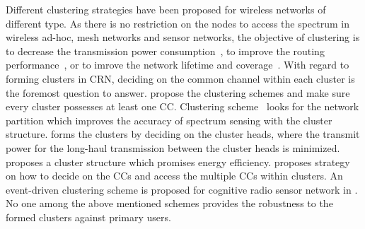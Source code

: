 \documentclass[10pt,journal,compsoc]{IEEEtran}
\theoremstyle{mytheoremstyle}
\theoremstyle{mytheoremstyle}
\theoremstyle{mytheoremstyle}
\begin{document}
Different clustering strategies have been proposed for wireless networks of different type.
As there is no restriction on the nodes to access the spectrum in wireless ad-hoc, mesh networks and sensor networks, the objective of clustering is to decrease the transmission power consumption~\cite{Kawadia03}, to improve the routing performance~\cite{clustering_mesh_globecom2010}, or to imrove the network lifetime and coverage~\cite{Abbasi_survey_07}.
With regard to forming clusters in CRN, deciding on the common channel within each cluster is the foremost question to answer.
\cite{Zhao07, Chen07,Affinity_clustering_09icccn} propose the clustering schemes and make sure every cluster possesses at least one CC.
Clustering scheme~\cite{Consensus_based_clustering12} looks for the network partition which improves the accuracy of spectrum sensing with the cluster structure.
\cite{TWC2012_cooperative_communication} forms the clusters by deciding on the cluster heads, where the transmit power for the long-haul transmission between the cluster heads is minimized.
\cite{clustering_globecom11} proposes a cluster structure which promises energy efficiency.
\cite{cluster_EW10} proposes strategy on how to decide on the CCs and access the multiple CCs within clusters.
An event-driven clustering scheme is proposed for cognitive radio sensor network in \cite{Ozger_cluster_crsn_13}.
No one among the above mentioned schemes provides the robustness to the formed clusters against primary users. 
\end{document}
